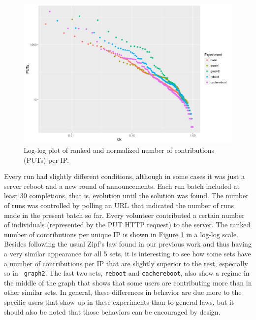 \documentclass[runningheads,a4paper]{llncs}\usepackage[]{graphicx}\usepackage[]{color}
\makeatletter
\def\maxwidth{ %
  \ifdim\Gin@nat@width>\linewidth
    \linewidth
  \else
    \Gin@nat@width
  \fi
}
\newenvironment{knitrout}{}{} %
\makeatother
\begin{document}
%
%
\begin{figure}[htbp]
\centering
\begin{knitrout}
\color{fgcolor}
\includegraphics[width=\maxwidth]{figure/zipf-1} 

\end{knitrout}
%
\caption{Log-log plot of ranked and normalized number of contributions (PUTs) per IP.\label{fig:zipf}}
\end{figure}
%
Every run had slightly different conditions, although in some cases it
was just a server reboot and a new round of announcements. Each run
batch included at least 30 completions, that is, evolution until the
solution was found. The number of runs was controlled by polling an
URL that indicated the number of runs made in the present batch so
far. Every volunteer contributed a certain number of individuals
(represented by the PUT HTTP request) to the server. The ranked number
of contributions per unique IP is shown in Figure \ref{fig:zipf} in a
log-log scale. Besides following the usual Zipf's law found in our
previous work and thus having a very similar appearance for all 5 sets, it
is interesting to see how some sets have a number of contributions per
IP that are slightly superior to the rest, especially so in {\tt
  graph2}. The last two sets, {\tt reboot} and {\tt cachereboot}, also
show a regime in the middle of the graph that shows that some users
are contributing more than in other similar sets. In general, these
differences in behavior are due more to the specific users that show
up in these experiments than to general laws, but it should also be
noted that those behaviors can be encouraged by design.
\end{document}
